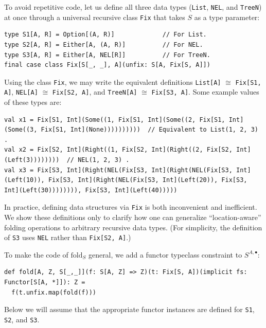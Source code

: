 To avoid repetitive code, let us define all three data types (\lstinline!List!,
\lstinline!NEL!, and \lstinline!TreeN!) at once through a universal
recursive class \lstinline!Fix! that takes  $S$ as a type parameter:
\begin{lstlisting}
type S1[A, R] = Option[(A, R)]             // For List.
type S2[A, R] = Either[A, (A, R)]          // For NEL.
type S3[A, R] = Either[A, NEL[R]]          // For TreeN.
final case class Fix[S[_, _], A](unfix: S[A, Fix[S, A]])
\end{lstlisting}
Using the class \lstinline!Fix!, we may write the equivalent definitions
\lstinline!List[A]! $\cong$ \lstinline!Fix[S1, A]!, \lstinline!NEL[A]!
$\cong$ \lstinline!Fix[S2, A]!, and \lstinline!TreeN[A]! $\cong$
\lstinline!Fix[S3, A]!. Some example values of these types are:
\begin{lstlisting}
val x1 = Fix[S1, Int](Some((1, Fix[S1, Int](Some((2, Fix[S1, Int](Some((3, Fix[S1, Int](None))))))))))  // Equivalent to List(1, 2, 3) .
val x2 = Fix[S2, Int](Right((1, Fix[S2, Int](Right((2, Fix[S2, Int](Left(3))))))))  // NEL(1, 2, 3) .
val x3 = Fix[S3, Int](Right(NEL(Fix[S3, Int](Right(NEL(Fix[S3, Int](Left(10)), Fix[S3, Int](Right(NEL(Fix[S3, Int](Left(20)), Fix[S3, Int](Left(30)))))))), Fix[S3, Int](Left(40)))))
\end{lstlisting}

In practice, defining data structures via \lstinline!Fix! is both
inconvenient and inefficient. We show these definitions only to clarify
how one can generalize \textsf{``}location-aware\textsf{''} folding operations to
arbitrary recursive data types. (For simplicity, the definition of
\lstinline!S3! uses \lstinline!NEL! rather than \lstinline!Fix[S2, A]!.)

To make the code of $\text{fold}_{S}$ general, we add a functor typeclass
constraint to $S^{A,\bullet}$:
\begin{lstlisting}
def fold[A, Z, S[_,_]](f: S[A, Z] => Z)(t: Fix[S, A])(implicit fs: Functor[S[A, *]]): Z =
  f(t.unfix.map(fold(f)))
\end{lstlisting}
Below we will assume that the appropriate functor instances are defined
for \lstinline!S1!, \lstinline!S2!, and \lstinline!S3!.

